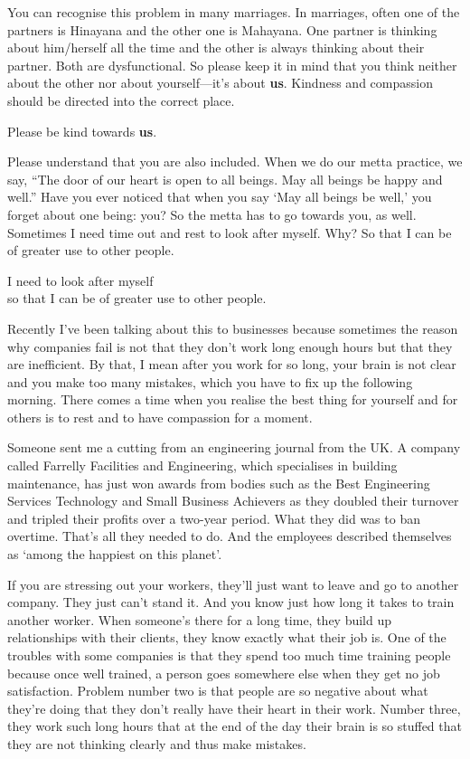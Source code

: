 \documentclass[12pt, openany]{book}
\newenvironment{aphorism}%
{%
\begin{center}\begin{itshape}
}%
{\end{itshape}\end{center}
}%
\begin{document}
You can recognise this problem in many marriages. In marriages, often one of the partners is Hinayana and the other one is Mahayana. One partner is thinking about him/herself all the time and the other is always thinking about their partner. Both are dysfunctional. So please keep it in mind that you think neither about the other nor about yourself—it’s about \textbf{us}. Kindness and compassion should be directed into the correct place. 

\begin{aphorism}
Please be kind towards \textbf{us}.
\end{aphorism}

Please understand that you are also included. When we do our metta practice, we say, “The door of our heart is open to all beings. May all beings be happy and well.” Have you ever noticed that when you say ‘May all beings be well,’ you forget about one being: you? So the metta has to go towards you, as well. Sometimes I need time out and rest to look after myself. Why? So that I can be of greater use to other people. 

\begin{aphorism}
I need to look after myself\\  
so that I can be of greater use to other people.
\end{aphorism}

Recently I’ve been talking about this to businesses because sometimes the reason why companies fail is not that they don’t work long enough hours but that they are inefficient. By that, I mean after you work for so long, your brain is not clear and you make too many mistakes, which you have to fix up the following morning. There comes a time when you realise the best thing for yourself and for others is to rest and to have compassion for a moment. 

Someone sent me a cutting from an engineering journal from the UK. A company called Farrelly Facilities and Engineering, which specialises in building maintenance, has just won awards from bodies such as the Best Engineering Services Technology and Small Business Achievers as they doubled their turnover and tripled their profits over a two-year period. What they did was to ban overtime. That’s all they needed to do. And the employees described themselves as ‘among the happiest on this planet’. 

If you are stressing out your workers, they’ll just want to leave and go to another company. They just can’t stand it. And you know just how long it takes to train another worker. When someone’s there for a long time, they build up relationships with their clients, they know exactly what their job is. One of the troubles with some companies is that they spend too much time training people because once well trained, a person goes somewhere else when they get no job satisfaction. Problem number two is that people are so negative about what they’re doing that they don’t really have their heart in their work. Number three, they work such long hours that at the end of the day their brain is so stuffed that they are not thinking clearly and thus make mistakes. 
\end{document}
